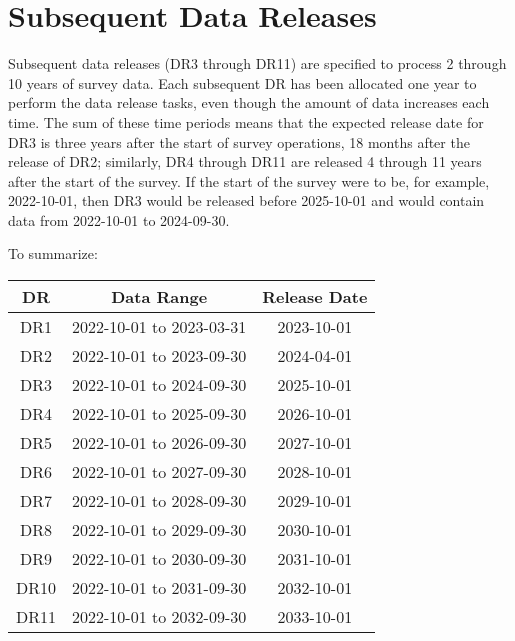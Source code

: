 \section{Subsequent Data Releases } \label{sect:drn}

Subsequent data releases (DR3 through DR11) are specified to process 2 through 10 years of survey data.
Each subsequent DR has been allocated one year to perform the data release tasks, even though the amount of data increases each time.
The sum of these time periods means that the expected release date for DR3 is three years after the start of survey operations, 18 months after the release of DR2; similarly, DR4 through DR11 are released 4 through 11 years after the start of the survey.
If the start of the survey were to be, for example, 2022-10-01, then DR3 would be released before 2025-10-01 and would contain data from 2022-10-01 to 2024-09-30.

To summarize:
\begin{tabular}{c c c}
DR & Data Range & Release Date \\
\hline
DR1 & 2022-10-01 to 2023-03-31 & 2023-10-01 \\
DR2 & 2022-10-01 to 2023-09-30 & 2024-04-01 \\
DR3 & 2022-10-01 to 2024-09-30 & 2025-10-01 \\
DR4 & 2022-10-01 to 2025-09-30 & 2026-10-01 \\
DR5 & 2022-10-01 to 2026-09-30 & 2027-10-01 \\
DR6 & 2022-10-01 to 2027-09-30 & 2028-10-01 \\
DR7 & 2022-10-01 to 2028-09-30 & 2029-10-01 \\
DR8 & 2022-10-01 to 2029-09-30 & 2030-10-01 \\
DR9 & 2022-10-01 to 2030-09-30 & 2031-10-01 \\
DR10 & 2022-10-01 to 2031-09-30 & 2032-10-01 \\
DR11 & 2022-10-01 to 2032-09-30 & 2033-10-01 \\
\end{tabular}
